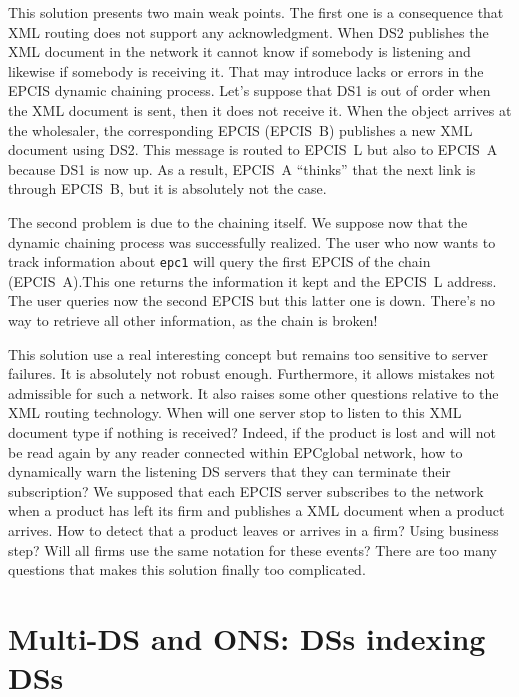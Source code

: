 \documentclass[a4paper]{llncs}
\begin{document}
This solution presents two main weak points.
The first one is a consequence that XML routing does not support any acknowledgment. When DS2
publishes the XML document in the network it cannot know if somebody is listening and likewise if
somebody is receiving it. That may introduce lacks or errors in the EPCIS dynamic chaining process.
Let's suppose that DS1 is out of order when the XML document is sent, then it does not receive it.
When the object arrives at the wholesaler, the corresponding EPCIS (EPCIS~B) publishes a new XML
document using DS2. This message is routed to EPCIS~L but also to EPCIS~A because DS1 is now up. As
a result, EPCIS~A ``thinks'' that the next link is through EPCIS~B, but it is  absolutely not the
case.%

The second problem is due to the chaining itself. We suppose now that the dynamic chaining process
was successfully realized. The user who now wants to track information about \texttt{epc1} will
query the first EPCIS of the chain (EPCIS~A).This one returns the information it kept and the
EPCIS~L address. The user queries now the second EPCIS but this latter one is down. There's no way
to retrieve all other information, as the chain is broken!

This solution use a real interesting concept but remains too sensitive to server failures. It is
absolutely not robust enough. Furthermore, it allows mistakes not admissible for such a network. It
also raises some other questions relative to the XML routing technology. When will one server stop
to listen to this XML document type if nothing is received? Indeed, if the product is lost and will
not be read again by any reader connected within EPCglobal network, how to dynamically warn the
listening DS servers that they can terminate their subscription? We supposed that each EPCIS server
subscribes to the network when a product has left its firm and publishes a XML document when a
product arrives. How to detect that a product leaves or arrives in a firm? Using business step? Will
all firms use the same notation for these events? There are too many questions that makes this
solution finally too complicated.


\section{Multi-DS and ONS: DSs indexing DSs}
\end{document}
